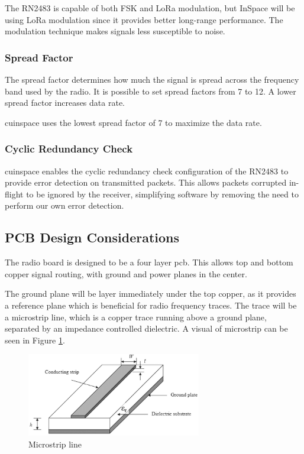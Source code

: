 The RN2483 is capable of both FSK and LoRa modulation, but InSpace will be using LoRa modulation since it provides
better long-range performance. The modulation technique makes signals less susceptible to noise.

\subsubsection{Spread Factor}

The spread factor determines how much the signal is spread across the frequency band used by the radio. It is possible
to set spread factors from 7 to 12. \cite[Sec. 2.5.5.14]{rn2483-commands} A lower spread factor increases data rate.

\Gls{cuinspace} uses the lowest spread factor of 7 to maximize the data rate.

\subsubsection{Cyclic Redundancy Check}

\Gls{cuinspace} enables the cyclic redundancy check configuration of the RN2483 to provide error detection on
transmitted packets. This allows packets corrupted in-flight to be ignored by the receiver, simplifying software by
removing the need to perform our own error detection.

\subsection{PCB Design Considerations}

The radio board is designed to be a four layer \gls{pcb}. This allows top and bottom copper signal routing, with ground
and power planes in the center.

The ground plane will be layer immediately under the top copper, as it provides a reference plane which is beneficial
for radio frequency traces. The trace will be a microstrip line, which is a copper trace running above a ground plane,
separated by an impedance controlled dielectric. A visual of microstrip can be seen in Figure \ref{fig:microstrip}.

\begin{figure}[H]
    \centering
    \includegraphics[width=3in]{assets/images/microstrip.png}
    \caption{Microstrip line \cite{microstrip}}
    \label{fig:microstrip}
\end{figure}


